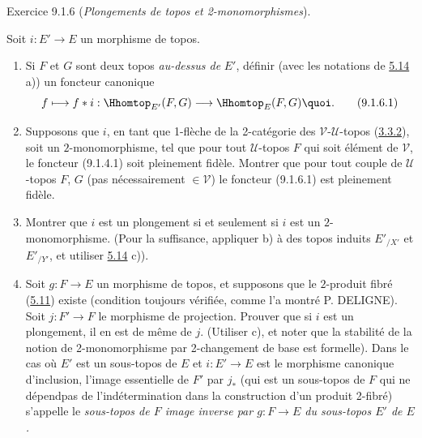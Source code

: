 \documentclass[10pt]{../fichiers-configuration-latex/smfart}
\begin{document}
\begin{enonce*}[remark]{Exercice 9.1.6}
(\emph{Plongements de topos et 2-monomorphismes}).

Soit $i:E'\rightarrow E$ un morphisme de topos.

\begin{enumerate}
\renewcommand{\theenumi}{\alph{enumi}}
\renewcommand{\labelenumi}{\theenumi)}
\item Si $F$ et $G$ sont deux topos \emph{au-dessus de} $E'$, définir
(avec les notations de \hyperref[IV.exer5.14]{5.14} a)) un foncteur canonique
\begin{equation*}
f\longmapsto f\ast i:\Hhomtop_{E'}(F,G)\longrightarrow
\Hhomtop_E(F,G){\quoi}.\tag{9.1.6.1}
\end{equation*}

\item Supposons que $i$, en tant que 1-flèche de la 2-catégorie des
$𝒱\text{-}𝒰$-topos (\hyperref[IV.subsubsec3.3.2]{3.3.2}), soit
un $2$-monomorphisme, \ie tel que pour tout $𝒰$-topos $F$ qui
soit élément de $𝒱$, le foncteur (9.1.4.1) soit pleinement %
fidèle. Montrer que pour tout couple de $𝒰$-topos $F$, $G$
(pas nécessairement $\in 𝒱$) le foncteur (9.1.6.1) est %
pleinement fidèle.

\item Montrer que $i$ est un plongement si et seulement si $i$ est un
$2$-monomorphisme. (Pour la suffisance, appliquer b) à des topos
induits $E'_{/X'}$ et $E'_{/Y'}$, et utiliser \hyperref[IV.exer5.14]{5.14} c)).

\item Soit $g:F\rightarrow E$ un morphisme de topos, et supposons que
le $2$-produit fibré (\hyperref[IV.prop5.11]{5.11}) 
existe (condition toujours vérifiée, comme l'a montré P. DELIGNE).
Soit $j:F'\rightarrow F$ le morphisme de projection. Prouver que si
$i$ est un plongement, il en est de même de $j$. (Utiliser c), et
noter que la stabilité de la notion de 2-monomorphisme par
2-changement de base est formelle). Dans le cas où $E'$ est un
sous-topos de $E$ et $i:E'\rightarrow E$ est le morphisme canonique
d'inclusion, l'image essentielle de $F'$ par $j_{\ast}$ (qui est un
sous-topos de $F$ qui ne dépend\pageoriginale pas de
l'indétermination dans la construction d'un produit 2-fibré)
s'appelle le \emph{sous-topos de $F$ image inverse par
$g:F\rightarrow E$ du sous-topos $E'$ de $E$.}


\end{enumerate}
\end{enonce*}
\end{document}
